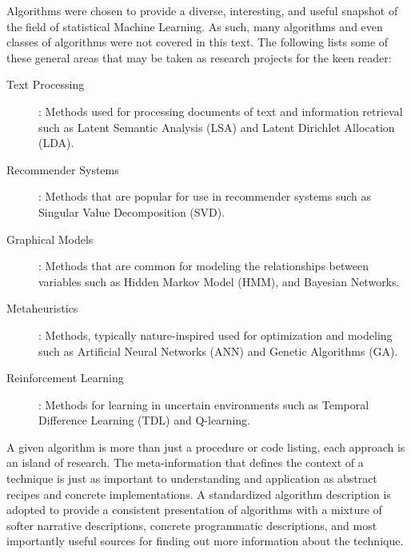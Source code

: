 Algorithms were chosen to provide a diverse, interesting, and useful snapshot of the field of statistical Machine  Learning. As such, many algorithms and even classes of algorithms were not covered in this text. The following lists some of these general areas that may be taken as research projects for the keen reader:

\begin{description}
	\item[Text Processing]: Methods used for processing documents of text and information retrieval such as Latent Semantic Analysis (LSA) and Latent Dirichlet Allocation (LDA).
	\item[Recommender Systems]: Methods that are popular for use in recommender systems such as Singular Value Decomposition (SVD).
	\item[Graphical Models]: Methods that are common for modeling the relationships between variables such as Hidden Markov Model (HMM), and Bayesian Networks.
	\item[Metaheuristics]: Methods, typically nature-inspired used for optimization and modeling such as Artificial Neural Networks (ANN) and Genetic Algorithms (GA).
	\item[Reinforcement Learning]: Methods for learning in uncertain environments such as Temporal Difference Learning (TDL) and Q-learning.
\end{description}

A given algorithm is more than just a procedure or code listing, each approach is an island of research. The meta-information that defines the context of a technique is just as important to understanding and application as abstract recipes and concrete implementations. A standardized algorithm description is adopted to provide a consistent presentation of algorithms with a mixture of softer narrative descriptions, concrete programmatic descriptions, and most importantly useful sources for finding out more information about the technique.

